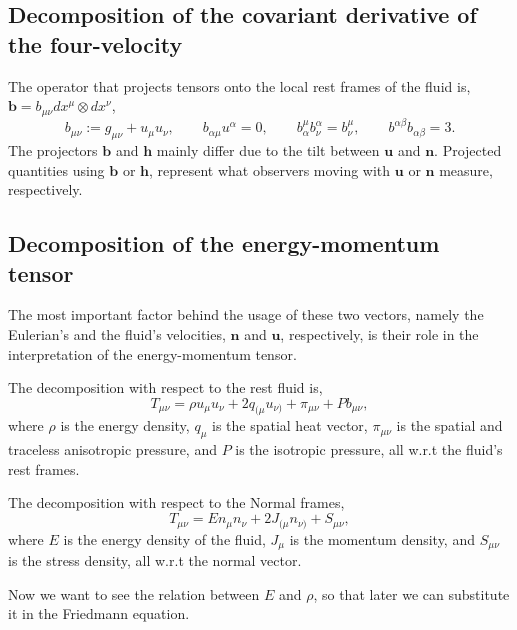 \subsection{Decomposition of the covariant derivative of the four-velocity}

The operator that projects tensors onto the local rest frames of the fluid is, $\mathbf{b}=b_{\mu\nu}dx^\mu \otimes dx^\nu$,
\begin{equation}
    b_{\mu\nu}:=g_{\mu\nu}+u_\mu u_\nu,\qquad b_{\alpha\mu}u^\alpha=0,\qquad b^\mu_\alpha b^\alpha_\nu = b^\mu_\nu,\qquad b^{\alpha\beta}b_{\alpha\beta}=3.
\end{equation}
The projectors $\mathbf{b}$ and $\mathbf{h}$ mainly differ due to the tilt between $\mathbf{u}$ and $\mathbf{n}$.
Projected quantities using $\mathbf{b}$ or $\mathbf{h}$, represent what observers moving with $\mathbf{u}$ or $\mathbf{n}$ measure, respectively.


\subsection{Decomposition of the energy-momentum tensor}
The most important factor behind the usage of these two vectors, namely the Eulerian's and the fluid's velocities, $\mathbf{n}$ and $\mathbf{u}$, respectively, is their role in the interpretation of the energy-momentum tensor.

The decomposition with respect to the rest fluid is,
\begin{equation}
    T_{\mu\nu}=\rho u_\mu u_\nu + 2q_{(\mu}u_{\nu)} + \pi_{\mu\nu} + P b_{\mu\nu},
    \label{eqn:general_decomposition_energy_tensor_fluid}
\end{equation}
where $\rho$ is the energy density, $q_\mu$ is the spatial heat vector, $\pi_{\mu\nu}$ is the spatial and traceless anisotropic pressure, and $P$ is the isotropic pressure, all w.r.t the fluid's rest frames.

The decomposition with respect to the Normal frames,
\begin{equation}
    T_{\mu\nu} = E n_\mu n_\nu + 2J_{(\mu}n_{\nu)}+ S_{\mu\nu},
    \label{eqn:general_decomposition_energy_tensor_normal}
\end{equation}
where $E$ is the energy density of the fluid, $J_\mu$ is the momentum density, and $S_{\mu\nu}$ is the stress density, all w.r.t the normal vector.

Now we want to see the relation between $E$ and $\rho$, so that later we can substitute it in the Friedmann equation.

